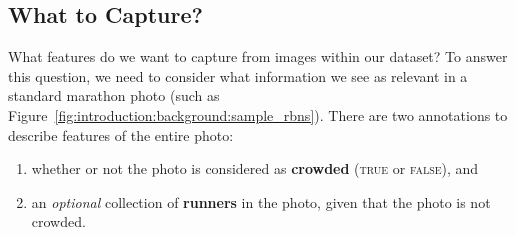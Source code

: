 \subsection{What to Capture?}
\label{sec:dataset:architecture:what_to_capture}

What features do we want to capture from images within our dataset? To answer this question, we need to consider what information we see as relevant in a standard marathon photo (such as Figure~\ref{fig:introduction:background:sample_rbns}). There are two annotations to describe features of the entire photo:

\begin{enumerate}
  \item whether or not the photo is considered as \textbf{crowded} (\textsc{true} or \textsc{false}), and
  \item an \textit{optional} collection of \textbf{runners} in the photo, given that the photo is not crowded.
\end{enumerate}

